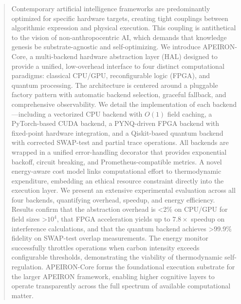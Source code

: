 \begin{abstract}
Contemporary artificial intelligence frameworks are predominantly optimized for specific hardware targets, creating tight couplings between algorithmic expression and physical execution. This coupling is antithetical to the vision of non-anthropocentric AI, which demands that knowledge genesis be substrate-agnostic and self-optimizing. We introduce APEIRON-Core, a multi-backend hardware abstraction layer (HAL) designed to provide a unified, low-overhead interface to four distinct computational paradigms: classical CPU/GPU, reconfigurable logic (FPGA), and quantum processing. The architecture is centered around a pluggable factory pattern with automatic backend selection, graceful fallback, and comprehensive observability. We detail the implementation of each backend—including a vectorized CPU backend with \(O(1)\) field caching, a PyTorch-based CUDA backend, a PYNQ-driven FPGA backend with fixed-point hardware integration, and a Qiskit-based quantum backend with corrected SWAP-test and partial trace operations. All backends are wrapped in a unified error-handling decorator that provides exponential backoff, circuit breaking, and Prometheus-compatible metrics. A novel energy-aware cost model links computational effort to thermodynamic expenditure, embedding an ethical resource constraint directly into the execution layer. We present an extensive experimental evaluation across all four backends, quantifying overhead, speedup, and energy efficiency. Results confirm that the abstraction overhead is <2\% on CPU/GPU for field sizes >\(10^4\), that FPGA acceleration yields up to \(7.8\times\) speedup on interference calculations, and that the quantum backend achieves >99.9\% fidelity on SWAP-test overlap measurements. The energy monitor successfully throttles operations when carbon intensity exceeds configurable thresholds, demonstrating the viability of thermodynamic self-regulation. APEIRON-Core forms the foundational execution substrate for the larger APEIRON framework, enabling higher cognitive layers to operate transparently across the full spectrum of available computational matter.
\end{abstract}